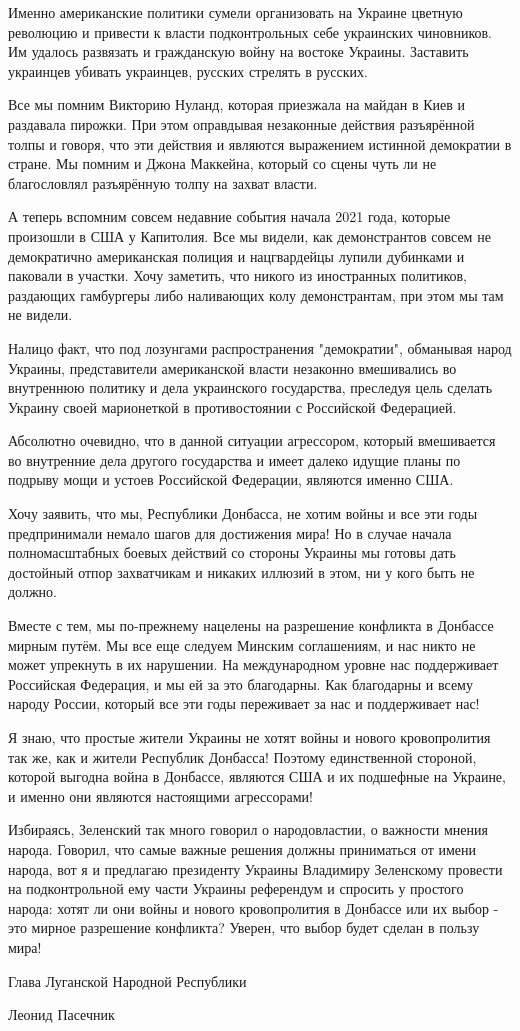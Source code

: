 Именно американские политики сумели организовать на Украине цветную революцию и
привести к власти подконтрольных себе украинских чиновников. Им удалось
развязать и гражданскую войну на востоке Украины. Заставить украинцев убивать
украинцев, русских стрелять в русских.

Все мы помним Викторию Нуланд, которая приезжала на майдан в Киев и раздавала
пирожки. При этом оправдывая незаконные действия разъярённой толпы и говоря,
что эти действия и являются выражением истинной демократии в стране. Мы помним
и Джона Маккейна, который со сцены чуть ли не благословлял разъярённую толпу на
захват власти.

А теперь вспомним совсем недавние события начала 2021 года, которые произошли в
США у Капитолия. Все мы видели, как демонстрантов совсем не демократично
американская полиция и нацгвардейцы лупили дубинками и паковали в участки. Хочу
заметить, что никого из иностранных политиков, раздающих гамбургеры либо
наливающих колу демонстрантам, при этом мы там не видели.

Налицо факт, что под лозунгами распространения "демократии", обманывая народ
Украины, представители американской власти незаконно вмешивались во внутреннюю
политику и дела украинского государства, преследуя цель сделать Украину своей
марионеткой в противостоянии с Российской Федерацией.

Абсолютно очевидно, что в данной ситуации агрессором, который вмешивается во
внутренние дела другого государства и имеет далеко идущие планы по подрыву мощи
и устоев Российской Федерации, являются именно США.

Хочу заявить, что мы, Республики Донбасса, не хотим войны и все эти годы
предпринимали немало шагов для достижения мира! Но в случае начала
полномасштабных боевых действий со стороны Украины мы готовы дать достойный
отпор захватчикам и никаких иллюзий в этом, ни у кого быть не должно.  

Вместе с тем, мы по-прежнему нацелены на разрешение конфликта в Донбассе мирным
путём. Мы все еще следуем Минским соглашениям, и нас никто не может упрекнуть в
их нарушении. На международном уровне нас поддерживает Российская Федерация, и
мы ей за это благодарны. Как благодарны и всему народу России, который все эти
годы переживает за нас и поддерживает нас!

Я знаю, что простые жители Украины не хотят войны и нового кровопролития так
же, как и жители Республик Донбасса! Поэтому единственной стороной, которой
выгодна война в Донбассе, являются США и их подшефные на Украине, и именно они
являются настоящими агрессорами!

Избираясь, Зеленский так много говорил о народовластии, о важности мнения
народа. Говорил, что самые важные решения должны приниматься от имени народа,
вот я и предлагаю президенту Украины Владимиру Зеленскому провести на
подконтрольной ему части Украины референдум и спросить у простого народа: хотят
ли они войны и нового кровопролития в Донбассе или их выбор - это мирное
разрешение конфликта? Уверен, что выбор будет сделан в пользу мира!

Глава Луганской Народной Республики

Леонид Пасечник
